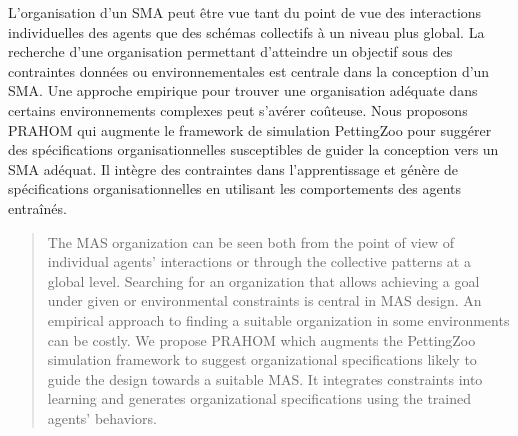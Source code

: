 \documentclass[demonstration]{jfsma}
\newcommand{\jp}[1]{\textbf{\color{red} JPJ: #1}}
\newcounter{relation}
\begin{document}
\maketitle

\begin{resume}

L'organisation d'un SMA peut être vue tant du point de vue des interactions individuelles des agents que des schémas collectifs à un niveau plus global.
La recherche d'une organisation permettant d'atteindre un objectif sous des contraintes données ou environnementales est centrale dans la conception d'un SMA.
%
Une approche empirique pour trouver une organisation adéquate dans certains environnements complexes peut s'avérer coûteuse.
%
Nous proposons PRAHOM qui augmente le framework de simulation PettingZoo pour suggérer des spécifications organisationnelles susceptibles de guider la conception vers un SMA adéquat.
Il intègre des contraintes dans l'apprentissage et génère de spécifications organisationnelles en utilisant les comportements des agents entraînés.

\end{resume}


\bigskip

\begin{abstract}

The MAS organization can be seen both from the point of view of individual agents' interactions or through the collective patterns at a global level. Searching for an organization that allows achieving a goal under given or environmental constraints is central in MAS design.
%
An empirical approach to finding a suitable organization in some environments can be costly.
%
We propose PRAHOM which augments the PettingZoo simulation framework to suggest organizational specifications likely to guide the design towards a suitable MAS.
It integrates constraints into learning and generates organizational specifications using the trained agents' behaviors.

\end{abstract}
\end{document}
